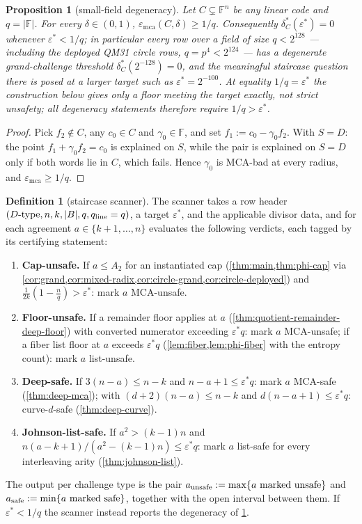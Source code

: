 \documentclass[11pt]{article}
\newtheorem{proposition}[proposition]{Proposition}
\theoremstyle{definition}
\newtheorem{definition}[definition]{Definition}
\theoremstyle{remark}
\newcommand{\F}{\mathbb{F}}
\newcommand{\B}{B}
\newcommand{\emca}{\varepsilon_{\mathrm{mca}}}
\begin{document}
\begin{proposition}[small-field degeneracy]\label{prop:small-field}
Let $C\subsetneq\F^n$ be any linear code and $q=|\F|$. For every $\delta\in(0,1)$, $\emca(C,\delta)\ge1/q$. Consequently $\delta^*_C(\varepsilon^*)=0$ whenever $\varepsilon^*<1/q$; in particular every row over a field of size $q<2^{128}$ --- including the deployed QM31 circle rows, $q=p^4<2^{124}$ --- has a degenerate grand-challenge threshold $\delta^*_C(2^{-128})=0$, and the meaningful staircase question there is posed at a larger target such as $\varepsilon^*=2^{-100}$. At equality $1/q=\varepsilon^*$ the construction below gives only a floor meeting the target exactly, not strict unsafety; all degeneracy statements therefore require $1/q>\varepsilon^*$.
\end{proposition}

\begin{proof}
Pick $f_2\notin C$, any $c_0\in C$ and $\gamma_0\in\F$, and set $f_1:=c_0-\gamma_0f_2$. With $S=D$: the point $f_1+\gamma_0f_2=c_0$ is explained on $S$, while the pair is explained on $S=D$ only if both words lie in $C$, which fails. Hence $\gamma_0$ is MCA-bad at every radius, and $\emca\ge1/q$.
\end{proof}

\begin{definition}[staircase scanner]\label{def:scanner}
The scanner takes a row header $(D\text{-type},n,k,|\B|,q,q_{\rm line}=q)$, a target $\varepsilon^*$, and the applicable divisor data, and for each agreement $a\in\{k+1,\dots,n\}$ evaluates the following verdicts, each tagged by its certifying statement:
\begin{enumerate}[label=\textup{(V\arabic*)},leftmargin=2.6em]
\item \textbf{Cap-unsafe.} If $a\le A_2$ for an instantiated cap \textup(\cref{thm:main,thm:phi-cap} via \cref{cor:grand,cor:mixed-radix,cor:circle-grand,cor:circle-deployed}\textup) and $\frac1{2k}(1-\frac nq)>\varepsilon^*$: mark $a$ MCA-unsafe.
\item \textbf{Floor-unsafe.} If a remainder floor applies at $a$ \textup(\cref{thm:quotient-remainder-deep-floor}\textup) with converted numerator exceeding $\varepsilon^*q$: mark $a$ MCA-unsafe; if a fiber list floor at $a$ exceeds $\varepsilon^*q$ \textup(\cref{lem:fiber,lem:phi-fiber} with the entropy count\textup): mark $a$ list-unsafe.
\item \textbf{Deep-safe.} If $3(n-a)\le n-k$ and $n-a+1\le\varepsilon^*q$: mark $a$ MCA-safe \textup(\cref{thm:deep-mca}\textup); with $(d+2)(n-a)\le n-k$ and $d(n-a+1)\le\varepsilon^*q$: curve-$d$-safe \textup(\cref{thm:deep-curve}\textup).
\item \textbf{Johnson-list-safe.} If $a^2>(k-1)n$ and $n(a-k+1)/(a^2-(k-1)n)\le\varepsilon^*q$: mark $a$ list-safe for every interleaving arity \textup(\cref{thm:johnson-list}\textup).
\end{enumerate}
The output per challenge type is the pair $a_{\rm unsafe}:=\max\{a\ \text{marked unsafe}\}$ and $a_{\rm safe}:=\min\{a\ \text{marked safe}\}$, together with the open interval between them. If $\varepsilon^*<1/q$ the scanner instead reports the degeneracy of \cref{prop:small-field}.
\end{definition}
\end{document}
